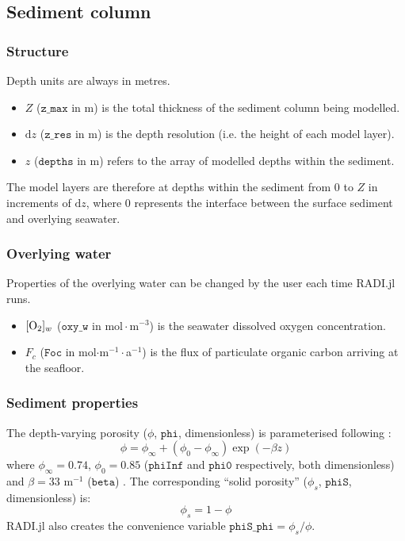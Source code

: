 \documentclass[a4paper]{article}
\newcommand{\D}[1]{\mathrm{d}#1}
\newcommand{\code}[1]{\texttt{#1}}
\newcommand{\molmmm}{\mathrm{mol}\cdot\mathrm{m}^{-3}}
\begin{document}
\subsection{Sediment column}

\subsubsection{Structure}

Depth units are always in metres.
\begin{itemize}
  \item $Z$ ($\code{z\_max}$ in m) is the total thickness of the sediment column being modelled.
  \item $\D{z}$ ($\code{z\_res}$ in m) is the depth resolution (i.e. the height of each model layer).
  \item $z$ ($\code{depths}$ in m) refers to the array of modelled depths within the sediment.
\end{itemize}
The model layers are therefore at depths within the sediment from $0$ to $Z$ in increments of $\D{z}$, where $0$ represents the interface between the surface sediment and overlying seawater.

\subsubsection{Overlying water}

Properties of the overlying water can be changed by the user each time RADI.jl runs.

\begin{itemize}
  \item $[\ce{O2}]_w$ ($\code{oxy\_w}$ in $\molmmm$) is the seawater dissolved oxygen concentration.
  \item $F_c$ ($\code{Foc}$ in mol$\cdot$m$^{-1}\cdot$a$^{-1}$) is the flux of particulate organic carbon arriving at the seafloor.
\end{itemize}

\subsubsection{Sediment properties}

The depth-varying porosity ($\phi$, $\code{phi}$, dimensionless) is parameterised following \citet{boudreau_method--lines_1996}:
\begin{equation}\label{phi}
\phi = \phi_\infty + (\phi_0 - \phi_\infty) \exp(-\beta z)
\end{equation}
where $\phi_\infty = 0.74$, $\phi_0 = 0.85$ ($\code{phiInf}$ and $\code{phi0}$ respectively, both dimensionless) and $\beta = 33$ m$^{-1}$ ($\code{beta}$) \citep{boudreau_method--lines_1996}. The corresponding ``solid porosity'' ($\phi_s$, $\code{phiS}$, dimensionless) is:
\begin{equation}\label{phiS}
\phi_s = 1 - \phi
\end{equation}
RADI.jl also creates the convenience variable $\code{phiS\_phi} = \phi_s/\phi$.
\end{document}
